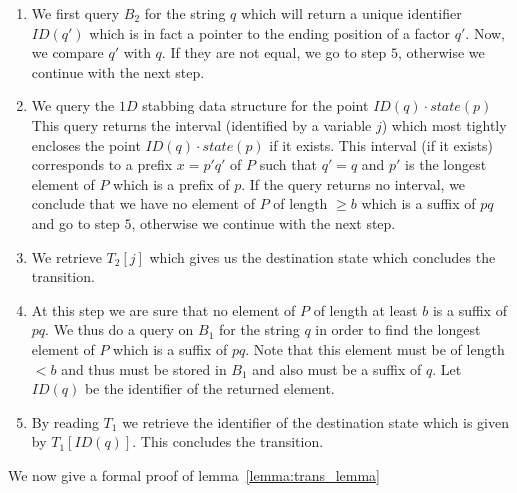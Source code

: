 \documentclass{article}
\newcommand{\?}{\mskip1.5mu}
\begin{document}
\begin{enumerate}
\item We first query $B_2$ for the string $q$ which will return a unique identifier $ID(q')$ which is in fact a pointer to the ending position of a factor $q'$. Now, we compare $q'$ with $q$. If they are not equal, we go to step $5$, otherwise we continue with the next step. 
\item We query the $1D$ stabbing data structure for the point $ID(q)\cdot state(p)$ This query returns the interval (identified by a variable $j$) which most tightly encloses the point $ID(q)\cdot state(p)$ if it exists. This interval (if it exists) corresponds to a prefix $x=p'q'$ of $P$ such that $q'=q$ and $p'$ is the longest element of $P$ which is a prefix of $p$. If the query returns no interval, we conclude that we have no element of $P$ of length $\geq b$ which is a suffix of $pq$ and go to step $5$, otherwise we continue with the next step.
\item We retrieve $T_2[j]$ which gives us the destination state which concludes the transition. 
\item At this step we are sure that no element of $P$ of length at least $b$ is a suffix of $pq$. We thus do a query on $B_1$ for the string $q$ in order to find the longest element of $P$ which is a suffix of $pq$. Note that this element must be of length $<b$ and thus must be stored in $B_1$ and also must be a suffix of $q$. Let $ID(q)$ be the identifier of the returned element. 
\item By reading $T_1$ we retrieve the identifier of the destination state which is given by $T_1[ID(q)]$. This concludes the transition. 
\end{enumerate}
We now give a formal proof of lemma~\ref{lemma:trans_lemma}
\end{document}

